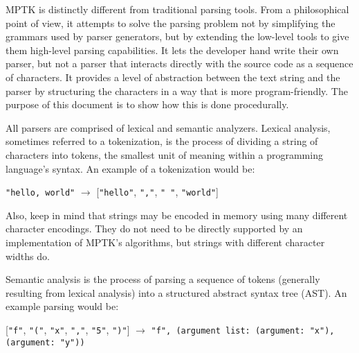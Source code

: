 \documentclass[10pt,a4paper]{article}
\begin{document}
MPTK is distinctly different from traditional parsing tools. From a philosophical point of view, it attempts to solve the parsing problem not by simplifying the grammars used by parser generators, but by extending the low-level tools to give them high-level parsing capabilities. It lets the developer hand write their own parser, but not a parser that interacts directly with the source code as a sequence of characters. It provides a level of abstraction between the text string and the parser by structuring the characters in a way that is more program-friendly. The purpose of this document is to show how this is done procedurally.

All parsers are comprised of lexical and semantic analyzers. Lexical analysis, sometimes referred to a tokenization, is the process of dividing a string of characters into tokens, the smallest unit of meaning within a programming language's syntax. An example of a tokenization would be:\newline

\verb|"hello, world"| $\rightarrow$ [\verb|"hello"|, \verb|","|, \verb|" "|, \verb|"world"|]\newline

Also, keep in mind that strings may be encoded in memory using many different character encodings. They do not need to be directly supported by an implementation of MPTK's algorithms, but strings with different character widths do.

Semantic analysis is the process of parsing a sequence of tokens (generally resulting from lexical analysis) into a structured abstract syntax tree (AST). An example parsing would be:\newline

[\verb|"f"|, \verb|"("|, \verb|"x"|, \verb|","|, \verb|"5"|, \verb|")"|] $\rightarrow$ \verb|"f", (argument list: (argument: "x"), (argument: "y"))|\newline
\end{document}
